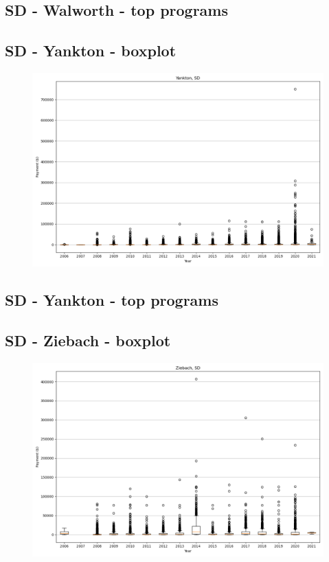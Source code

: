 \subsection*{SD - Walworth - top programs}

\newpage
\subsection*{SD - Yankton - boxplot}
\begin{figure}[h]
\centering
\includegraphics[width=7in]{../output/boxplots/counties/Yankton-SD_boxplot.png}
\end{figure}


\subsection*{SD - Yankton - top programs}

\newpage
\subsection*{SD - Ziebach - boxplot}
\begin{figure}[h]
\centering
\includegraphics[width=7in]{../output/boxplots/counties/Ziebach-SD_boxplot.png}
\end{figure}


